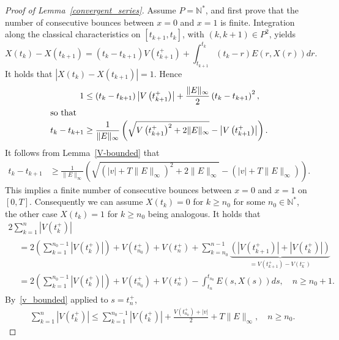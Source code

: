 \documentclass[AHL,Unicode,longabstracts,published]{cedram}
\newcommand{\N}{\mathbb{N}}
\begin{document}
\begin{proof}[{Proof of Lemma~\ref{convergent_series}}]
Assume $P=\N^*$, and first prove that the number of consecutive bounces between $x=0$ and $x=1$ is finite. Integration along the classical characteristics on $[t_{k+1}, t_k]$, with $(k,k+1)\in P^2$, yields
\[
X\left(t_k\right) - X\left(t_{k+1}\right) = \left(t_k - t_{k+1}\right) V\left(t_{k+1}^+\right) + \int_{t_{k+1}}^{t_k} \left(t_k-r\right) E(r,X(r))dr.
\]
It holds that $|X(t_k) - X(t_{k+1})|=1$. Hence
\begin{align*}
1 &\leq \left(t_k - t_{k+1}\right) \left|V\left(t_{k+1}^+\right)\right| + \frac{\|E\|_{\infty }}{2} \left(t_k - t_{k+1}\right)^2,
\\
\intertext{so that}
t_k - t_{k+1} &\geq \frac{1}{\| E \|_{\infty }} \left (\sqrt{V\left(t_{k+1}^+\right)^2 + 2\| E \|_{\infty }} - \left|V\left(t_{k+1}^+\right)\right| \right).
\end{align*}
It follows from Lemma~\ref{V-bounded} that
\begin{align*}
t_k - t_{k+1} &\geq \frac{1}{\| E \|_{\infty }} \left (\sqrt{(|v|+T\|E\|_{\infty })^2 + 2\|E\|_{\infty }} - (|v|+T\|E\|_{\infty }) \right).
\end{align*}
This implies a finite number of consecutive bounces between $x=0$ and $x=1$ on $[0,T]$. Consequently we can assume $X(t_k)=0$ for $k \geq n_0$ for some $n_0 \in \N^*$, the other case $X(t_k)=1$ for $k \geq n_0$ being analogous. It holds that
\begin{multline*}
2 \sum_{k=1}^n \left|V\left(t_k^+\right)\right|\\
\begin{aligned}
&= 2 \left(\sum_{k=1}^{n_0-1}\left|V\left(t_k^+\right)\right| \right) + V\left(t_{n_0}^+\right) + V\left(t_n^+\right) + \sum_{k=n_0}^{n-1} \underbrace{\left(\left|V\left(t_{k+1}^+\right)\right|+\left|V\left(t_k^+\right)\right|\right)}_{=V\left(t_{k+1}^+\right) - V\left(t_k^-\right)} \\
&= 2 \left(\sum_{k=1}^{n_0-1} \left|V\left(t_k^+\right)\right| \right) + V\left(t_{n_0}^+\right) + V\left(t_n^+\right) - \int_{t_n}^{t_{n_0}} E(s,X(s))ds,\quad n \geq n_0+1.
\end{aligned}
\end{multline*}
By~\eqref{v_bounded} applied to $s= t_n^+$,
\begin{align*}
&\sum_{k=1}^n \left|V\left(t_k^+\right)\right| \leq \sum_{k=1}^{n_0-1} \left|V\left(t_k^+\right)\right| + \frac{V\left(t_{n_0}^+\right)+|v|}{2} + T \| E \|_{\infty },\quad n \geq n_0.
\end{align*}
\end{proof}
\end{document}
